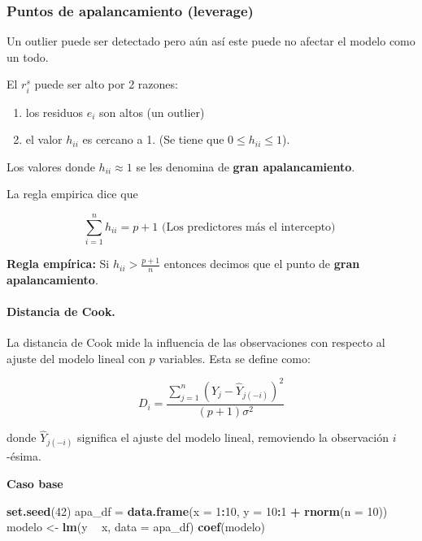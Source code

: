 \documentclass[
  12pt,
]{book}
\newenvironment{Shaded}{\begin{snugshade}}{\end{snugshade}}
\newcommand{\DataTypeTok}[1]{\textcolor[rgb]{0.13,0.29,0.53}{#1}}
\newcommand{\DecValTok}[1]{\textcolor[rgb]{0.00,0.00,0.81}{#1}}
\newcommand{\KeywordTok}[1]{\textcolor[rgb]{0.13,0.29,0.53}{\textbf{#1}}}
\newcommand{\NormalTok}[1]{#1}
\newcommand{\OperatorTok}[1]{\textcolor[rgb]{0.81,0.36,0.00}{\textbf{#1}}}
\newcommand{\StringTok}[1]{\textcolor[rgb]{0.31,0.60,0.02}{#1}}
\providecommand{\tightlist}{%
  \setlength{\itemsep}{0pt}\setlength{\parskip}{0pt}}
\theoremstyle{definition}
\theoremstyle{definition}
\theoremstyle{definition}
\theoremstyle{remark}
\begin{document}
\hypertarget{puntos-de-apalancamiento-leverage}{%
\subsubsection{Puntos de apalancamiento (leverage)}\label{puntos-de-apalancamiento-leverage}}

Un outlier puede ser detectado pero aún así este puede no afectar el modelo como un todo.

El \(r_{i}^s\) puede ser alto por 2 razones:

\begin{enumerate}
\def\labelenumi{\arabic{enumi}.}
\tightlist
\item
  los residuos \(e_i\) son altos (un outlier)
\item
  el valor \(h_{ii}\) es cercano a 1. (Se tiene que \(0\leq h_{ii}\leq 1\)).
\end{enumerate}

Los valores donde \(h_{ii}\approx 1\) se les denomina de \textbf{gran apalancamiento}.

La regla empirica dice que

\begin{equation*}
\sum_{i=1}^{n} h_{ii} = p +1 \text{  (Los predictores más el intercepto)   }
\end{equation*}

\textbf{Regla empírica:} Si \(h_{ii}>\frac{p+1}{n}\) entonces decimos que el punto de \textbf{gran apalancamiento}.

\hypertarget{distancia-de-cook.}{%
\paragraph{Distancia de Cook.}\label{distancia-de-cook.}}

La distancia de Cook mide la influencia de las observaciones con respecto al ajuste del modelo lineal con \(p\) variables. Esta se define como:

\[
\displaystyle D_i = \frac{\sum\limits_{j=1}^n (\hat{Y}_j - \hat{Y}_{j(-i)})^2}{(p+1) \sigma^2}
\]

donde \(\hat{Y}_{j(-i)}\) significa el ajuste del modelo lineal, removiendo la observación \(i\)-ésima.

\textbf{Caso base}

\begin{Shaded}
\begin{Highlighting}[]
\KeywordTok{set.seed}\NormalTok{(}\DecValTok{42}\NormalTok{)}
\NormalTok{apa_df =}\StringTok{ }\KeywordTok{data.frame}\NormalTok{(}\DataTypeTok{x =} \DecValTok{1}\OperatorTok{:}\DecValTok{10}\NormalTok{, }\DataTypeTok{y =} \DecValTok{10}\OperatorTok{:}\DecValTok{1} \OperatorTok{+}\StringTok{ }\KeywordTok{rnorm}\NormalTok{(}\DataTypeTok{n =} \DecValTok{10}\NormalTok{))}
\NormalTok{modelo <-}\StringTok{ }\KeywordTok{lm}\NormalTok{(y }\OperatorTok{~}\StringTok{ }\NormalTok{x, }\DataTypeTok{data =}\NormalTok{ apa_df)}
\KeywordTok{coef}\NormalTok{(modelo)}
\end{Highlighting}
\end{Shaded}
\end{document}
